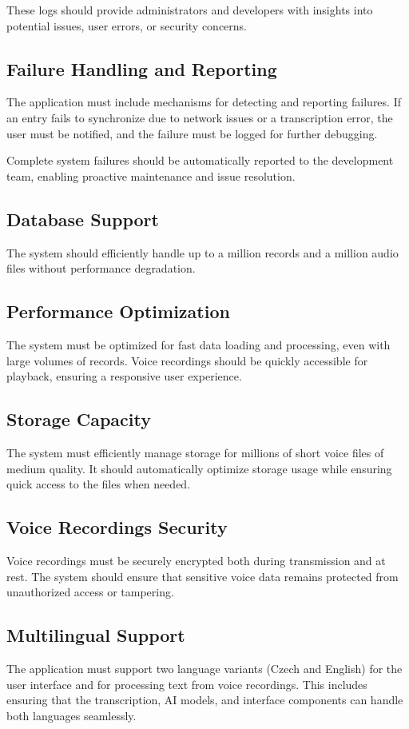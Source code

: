 \documentclass[
  digital,     %
  oneside,     %
  nosansbold,  %
  nocolorbold, %
  lof,         %
  lot,         %
]{fithesis4}
\begin{document}
These logs should provide administrators and developers with insights into potential issues, user errors, or security concerns.

\subsection{Failure Handling and Reporting}  
The application must include mechanisms for detecting and reporting failures. If an entry fails to synchronize due to network issues or a transcription error, the user must be notified, and the failure must be logged for further debugging.  

Complete system failures should be automatically reported to the development team, enabling proactive maintenance and issue resolution.

\subsection{Database Support}  
The system should efficiently handle up to a million records and a million audio files without performance degradation.  

\subsection{Performance Optimization}  
The system must be optimized for fast data loading and processing, even with large volumes of records. Voice recordings should be quickly accessible for playback, ensuring a responsive user experience.

\subsection{Storage Capacity}  
The system must efficiently manage storage for millions of short voice files of medium quality. It should automatically optimize storage usage while ensuring quick access to the files when needed.

\subsection{Voice Recordings Security}  
Voice recordings must be securely encrypted both during transmission and at rest. The system should ensure that sensitive voice data remains protected from unauthorized access or tampering.

\subsection{Multilingual Support}  
The application must support two language variants (Czech and English) for the user interface and for processing text from voice recordings. This includes ensuring that the transcription, AI models, and interface components can handle both languages seamlessly.
\end{document}
